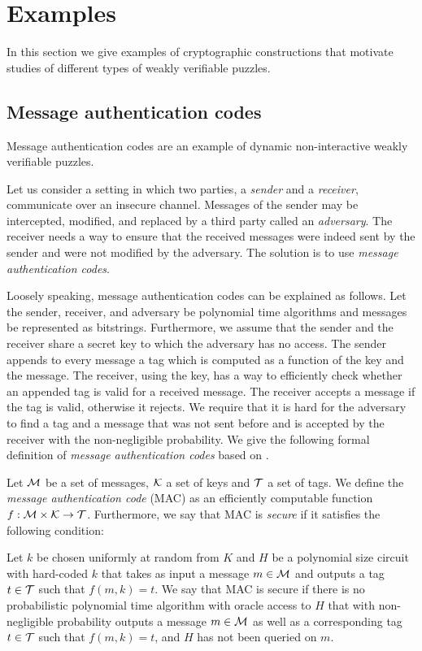 \section{Examples}
\label{section:wvp_examples}
In this section we give examples of cryptographic constructions that motivate studies of different types of weakly verifiable puzzles.

\subsection{Message authentication codes}
Message authentication codes are an example of dynamic non-interactive weakly verifiable puzzles.

Let us consider a setting in which two parties, a \textit{sender} and a \textit{receiver}, communicate over an insecure channel.
Messages of the sender may be intercepted, modified, and replaced by a third party called an \textit{adversary}.
The receiver needs a way to ensure that the received messages were indeed sent by the sender and were not modified by the adversary.
The solution is to use \textit{message authentication codes}.

Loosely speaking, message authentication codes can be explained as follows.
Let the sender, receiver, and adversary be polynomial time algorithms and messages be represented as bitstrings.
Furthermore, we assume that the sender and the receiver share a secret key to which the adversary has no access.
The sender appends to every message a tag which is computed as a function of the key and the message.
The receiver, using the key, has a way to efficiently check whether an appended tag is valid for a received message.
The receiver accepts a message if the tag is valid, otherwise it rejects.
We require that it is hard for the adversary to find a tag and a message that was not sent before and is
accepted by the receiver with the non-negligible probability. We give the following formal definition
of \textit{message authentication codes} based on \cite{LectureNotesCrypo, Goldreich:2004:FCV:975541}.
%
\begin{definition}
  \label{def:mac}
  Let $\mathcal{M}$ be a set of messages, $\mathcal{K}$ a set of keys and $\mathcal{T}$ a set of tags.
  We define the \textit{message authentication code} (MAC) as an efficiently computable function $f:\mathcal{M} \times \mathcal{K} \rightarrow \mathcal{T}$.
  Furthermore, we say that MAC is \textit{secure} if it satisfies the following condition:

  Let $k$ be chosen uniformly at random from $K$ and $H$ be a polynomial size circuit with hard-coded $k$
  that takes as input a message $m \in \mathcal{M}$ and outputs a tag $t \in \mathcal{T}$
  such that $f(m,k) = t$. We say that MAC is secure if there is no probabilistic polynomial time algorithm
  with oracle access to $H$ that with non-negligible probability outputs a message $m \in \mathcal{M}$
  as well as a corresponding tag $t \in \mathcal{T}$ such that $f(m, k) = t$, and $H$ has not been queried on $m$.
\end{definition}

